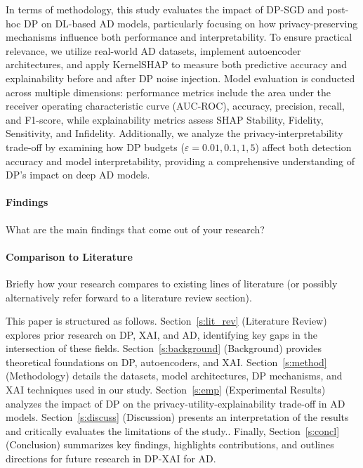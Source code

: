 In terms of methodology, this study evaluates the impact of DP-SGD and post-hoc DP on DL-based AD models, particularly focusing on how privacy-preserving mechanisms influence both performance and interpretability. To ensure practical relevance, we utilize real-world AD datasets, implement autoencoder architectures, and apply KernelSHAP to measure both predictive accuracy and explainability before and after DP noise injection. Model evaluation is conducted across multiple dimensions: performance metrics include the area under the receiver operating characteristic curve (AUC-ROC), accuracy, precision, recall, and F1-score, while explainability metrics assess SHAP Stability, Fidelity, Sensitivity, and Infidelity. Additionally, we analyze the privacy-interpretability trade-off by examining how DP budgets (\(\varepsilon = 0.01, 0.1, 1, 5\)) affect both detection accuracy and model interpretability, providing a comprehensive understanding of DP’s impact on deep AD models.

\paragraph{Findings} What are the main findings that come out of your research?

\paragraph{Comparison to Literature} Briefly how your research compares to existing lines of literature (or possibly alternatively refer forward to a literature review section).

This paper is structured as follows. Section~\ref{s:lit_rev} (Literature Review) explores prior research on DP, XAI, and AD, identifying key gaps in the intersection of these fields. Section~\ref{s:background} (Background) provides theoretical foundations on DP, autoencoders, and XAI. Section~\ref{s:method} (Methodology) details the datasets, model architectures, DP mechanisms, and XAI techniques used in our study. Section~\ref{s:emp} (Experimental Results) analyzes the impact of DP on the privacy-utility-explainability trade-off in AD models. Section~\ref{s:discuss} (Discussion) presents an interpretation of the results and critically evaluates the limitations of the study.. Finally, Section~\ref{s:concl} (Conclusion) summarizes key findings, highlights contributions, and outlines directions for future research in DP-XAI for AD.